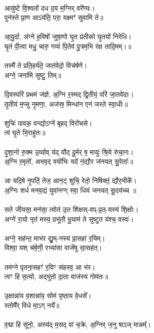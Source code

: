 \\
आयु॑ष्टे वि॒श्वतो॑ दध द॒य म॒ग्निर् वरे᳚ण्यः।\\
पुन॑स्ते प्रा॒ण आऽय॑ति॒ परा॒ यक्ष्मꣳ॑ सुवामि ते॥\\
\\
आ॒यु॒र्दा, अ॑ग्ने ह॒विषो॑ जुषा॒णो घृ॒त प्र॑तीको घृ॒तयो॑ निरेधि।\\
घृ॒तं पी॒त्वा मधु॒ चारु॒ गव्यं॑ पि॒तेव॑ पु॒त्रम॒भि र॑क्ष तादि॒मम्।॥\\
\\
तस्मै॑ ते प्रति॒हर्य॑ते॒ जात॑वेदो॒ विच॑र्षणे।\\
अग्ने॒ जना॑मि सुष्टु॒ तिम्॥\\
\\
दि॒वस्परि॑ प्रथमं ज॑ज्ञे, अ॒ग्नि र॒स्मद् द्वि॒तीयं॒ परि॑ जा॒तवे॑दाः।\\
तृ॒तीय॑ म॒प्सु नृ॒मणा॒, अज॑स्र॒ मिन्धा॑न एनं जरते स्वा॒धीः॥\\
\\
शुचिः॑ पावक॒ वन्द्योऽग्ने॑ बृहद् विरो॑चसे।\\
त्वं घृ॒ते भि॒राहु॑तः॥\\
\\
दृ॒शा॒नो रु॒क्म उ॒र्व्याव् य॑द् यौद् दु॒र्मर् ष॒ मायुः॑ श्रि॒ये रु॑चा॒नः।\\
अ॒ग्नि र॒मृतो॑, अभव॒द् वयो॑भिः यदे॑ नं॒द्यौर ज॑नयत् सु॒रेताः᳚॥\\
\\
आ यदि॒षे नृ॒पतिं॒ तेज॒ आन॒ट् शुचि॒ रेतो॒ निषिक्तं॒ द्यौर॒भीके᳚।\\
अ॒ग्निः शर्ध मनव॒द्यं युवा॑नग्ग् स्वा॒ धियं जनयत् सू॒दय॑च्च ॥\\
\\
सते जीयसा॒ मन॑सा॒ त्वोत॑ उ॒त शि॑क्षस्-वप्-प्र॒त्-यस्य॑ शि॒क्षोः।\\
अग्ने॑ रा॒यो नृत॑ मस्य॒ प्रभू॑तौ भू॒याम॑ ते सुष्टुत य॑श्च॒ वस्वः॑।\\
\\
अग्ने॒ सह॑न्त॒ माभ॑र द्यु॒म्-नस्य॑  प्रा॒सहा॑ र॒यिम्।\\
विश्वा॒ यश् च॑र्ष॒णी॒ रभ्या॑सा वाजे॑षु सा॒सह॑त्।\\
\\
तम॑ग्ने पृतना॒सहꣳ॑ र॒यिꣳ स॑हस्व॒ आ भ॑र।\\
त्वꣳ हि स॒त्यो, अद्भु॑तो दा॒ता वाज॑स्य गोम॑तः॥\\
\\
उ॒क्षान्ना॑य व॒शान्ना॑य॒ सोम॑ पृष्ठाय वे॒धसे᳚।\\
स्तोमै᳚र् विधे मा॒ऽग् नये᳚॥\\
\\
व॒द्मा हि सू॑नो॒, अस्य॑द् म॒सद् वा॑ च॒क्रे, अ॒ग्निर् ज॒नु षाऽज् मान्नम्᳚।\\
